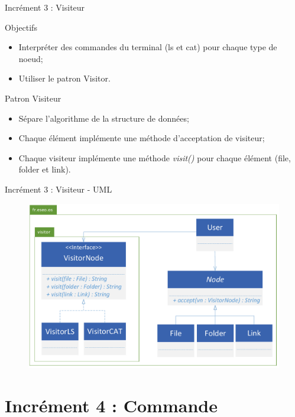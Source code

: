 \documentclass[utf8, 14pt]{beamer}
\begin{document}
	\begin{frame}{Incrément 3 : Visiteur}
		\begin{block}{Objectifs}
		\begin{itemize}
		\item Interpréter des commandes du terminal (ls et cat) pour chaque type de noeud;
		\item Utiliser le patron Visitor.
		\end{itemize}
		\end{block}
		
		\begin{exampleblock}{Patron Visiteur}
		\begin{itemize}
		\item Sépare l'algorithme de la structure de données;
		\item Chaque élément implémente une méthode d'acceptation de visiteur;
		\item Chaque visiteur implémente une méthode \emph{visit()} pour chaque élément (file, folder et link).
		\end{itemize}
		\end{exampleblock}					
	\end{frame}

	\begin{frame}{Incrément 3 : Visiteur - UML}
		\begin{figure}[!h]
		\centering
		\includegraphics[width=\textwidth]{../uml/uml-visitor}
		\end{figure}		
	\end{frame}


\section{Incrément 4 : Commande}
	
\end{document}
